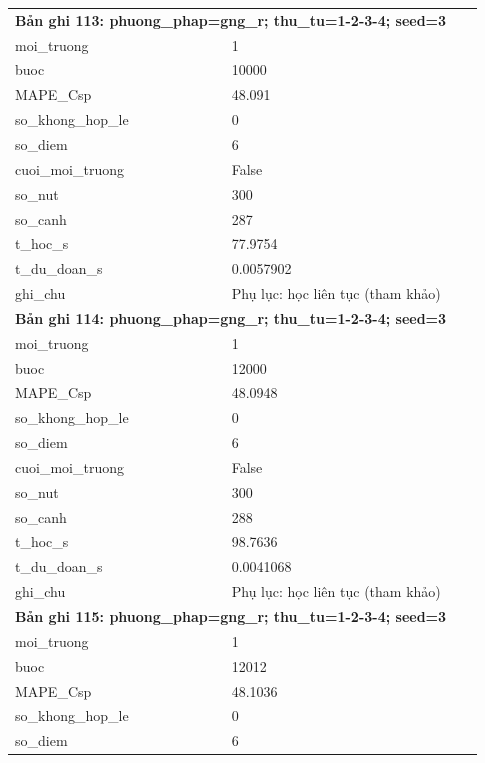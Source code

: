 \begin{longtable}{p{0.43\linewidth}p{0.50\linewidth}}
\midrule
\multicolumn{2}{p{0.95\linewidth}}{\textbf{Bản ghi 113: phuong\_phap=gng\_r; thu\_tu=1-2-3-4; seed=3}} \\
moi\_\allowbreak truong & 1 \\
buoc & 10000 \\
MAPE\_\allowbreak Csp & 48.091 \\
so\_\allowbreak khong\_\allowbreak hop\_\allowbreak le & 0 \\
so\_\allowbreak diem & 6 \\
cuoi\_\allowbreak moi\_\allowbreak truong & False \\
so\_\allowbreak nut & 300 \\
so\_\allowbreak canh & 287 \\
t\_\allowbreak hoc\_\allowbreak s & 77.9754 \\
t\_\allowbreak du\_\allowbreak doan\_\allowbreak s & 0.0057902 \\
ghi\_\allowbreak chu & Phụ lục: học liên tục (tham khảo) \\
\midrule
\multicolumn{2}{p{0.95\linewidth}}{\textbf{Bản ghi 114: phuong\_phap=gng\_r; thu\_tu=1-2-3-4; seed=3}} \\
moi\_\allowbreak truong & 1 \\
buoc & 12000 \\
MAPE\_\allowbreak Csp & 48.0948 \\
so\_\allowbreak khong\_\allowbreak hop\_\allowbreak le & 0 \\
so\_\allowbreak diem & 6 \\
cuoi\_\allowbreak moi\_\allowbreak truong & False \\
so\_\allowbreak nut & 300 \\
so\_\allowbreak canh & 288 \\
t\_\allowbreak hoc\_\allowbreak s & 98.7636 \\
t\_\allowbreak du\_\allowbreak doan\_\allowbreak s & 0.0041068 \\
ghi\_\allowbreak chu & Phụ lục: học liên tục (tham khảo) \\
\midrule
\multicolumn{2}{p{0.95\linewidth}}{\textbf{Bản ghi 115: phuong\_phap=gng\_r; thu\_tu=1-2-3-4; seed=3}} \\
moi\_\allowbreak truong & 1 \\
buoc & 12012 \\
MAPE\_\allowbreak Csp & 48.1036 \\
so\_\allowbreak khong\_\allowbreak hop\_\allowbreak le & 0 \\
so\_\allowbreak diem & 6 \\

\end{longtable}
